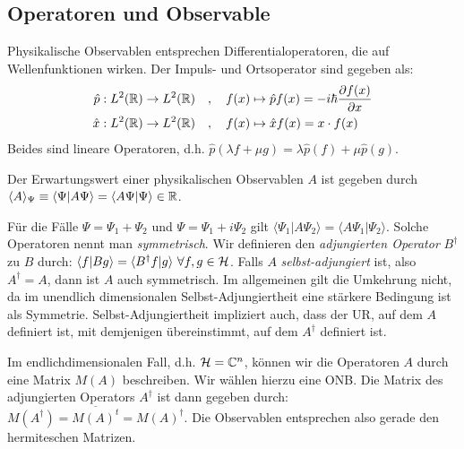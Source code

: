 \subsection{Operatoren und Observable}

Physikalische Observablen entsprechen Differentialoperatoren, die auf
Wellenfunktionen wirken. Der Impuls- und Ortsoperator sind gegeben als:
\begin{align}
    \hat{p} : L^2(\mathbb{R}) \rightarrow L^2(\mathbb{R})
    \hspace{10pt} &, \hspace{10pt}
    f(x) \mapsto \hat{p} f(x) = -i \hbar \frac{\partial f(x)}{\partial x} \label{Impulsoperator}
    \\
    \hat{x} : L^2(\mathbb{R}) \rightarrow L^2(\mathbb{R})
    \hspace{10pt} &, \hspace{10pt}
    f(x) \mapsto \hat{x} f(x) = x \cdot f(x) \label{Ortsoperator}
\end{align}
Beides sind lineare Operatoren, d.h. $\hat{p}(\lambda f + \mu g) = \lambda \hat{p}(f)
+ \mu \hat{p}(g)$.

\vspace{1\baselineskip}

Der Erwartungswert einer physikalischen Observablen $A$ ist gegeben durch
$\langle A \rangle_{\Psi} \equiv \langle \Psi | A \Psi \rangle =
\langle A \Psi | \Psi \rangle \in \mathbb{R}$.

\vspace{1\baselineskip}

Für die Fälle $\Psi = \Psi_1 + \Psi_2$ und $\Psi = \Psi_1 + i \Psi_2$ gilt
$\langle \Psi_1 | A \Psi_2 \rangle = \langle A \Psi_1 | \Psi_2 \rangle$.
Solche Operatoren nennt man \textit{symmetrisch}. Wir definieren den
\textit{adjungierten Operator} $B^\dagger$ zu $B$ durch:
$\langle f | B g \rangle = \langle B^\dagger f | g \rangle \ \forall f,g \in \mathcal{H}$.
Falls $A$ \textit{selbst-adjungiert} ist, also $A^\dagger = A$, dann ist $A$ auch
symmetrisch. Im allgemeinen gilt die Umkehrung nicht, da im unendlich dimensionalen
Selbst-Adjungiertheit eine stärkere Bedingung ist als Symmetrie. Selbst-Adjungiertheit
impliziert auch, dass der UR, auf dem $A$ definiert ist, mit demjenigen übereinstimmt,
auf dem $A^\dagger$ definiert ist.

Im endlichdimensionalen Fall, d.h. $\mathcal{H} = \mathbb{C}^n$, können wir die Operatoren $A$ durch
eine Matrix $M(A)$ beschreiben. Wir wählen hierzu eine ONB. Die Matrix des
adjungierten Operators $A^\dagger$ ist dann gegeben durch:
$M(A^\dagger) = \overline{M(A)^t} = M(A)^\dagger$. Die Observablen entsprechen
also gerade den hermiteschen Matrizen.

